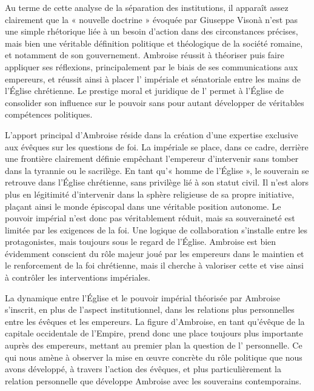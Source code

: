 Au terme de cette analyse de la séparation des institutions, il apparaît assez clairement que la « nouvelle doctrine » évoquée par Giuseppe Visonà n'est pas une simple rhétorique liée à un besoin d'action dans des circonstances précises, mais bien une véritable définition politique et théologique de la société romaine, et notamment de son gouvernement. Ambroise réussit à théoriser puis faire appliquer ses réflexions, principalement par le biais de ses communications aux empereurs, et réussit ainsi à placer l' impériale et sénatoriale entre les mains de l'Église chrétienne. Le prestige moral et juridique de l' permet à l'Église de consolider son influence sur le pouvoir sans pour autant développer de véritables compétences politiques.

\bigskip

L'apport principal d'Ambroise réside dans la création d'une expertise exclusive aux évêques sur les questions de foi. La  impériale se place, dans ce cadre, derrière une frontière clairement définie empêchant l'empereur d'intervenir sans tomber dans la tyrannie ou le sacrilège. En tant qu'« homme de l'Église », le souverain se retrouve dans l'Église chrétienne, sans privilège lié à son statut civil. Il n'est alors plus en légitimité d'intervenir dans la sphère religieuse de sa propre initiative, plaçant ainsi le monde épiscopal dans une véritable position autonome. Le pouvoir impérial n'est donc pas véritablement réduit, mais sa souveraineté est limitée par les exigences de la foi. Une logique de collaboration s'installe entre les protagonistes, mais toujours sous le regard de l'Église. Ambroise est bien évidemment conscient du rôle majeur joué par les empereurs dans le maintien et le renforcement de la foi chrétienne, mais il cherche à valoriser cette  et vise ainsi à contrôler les interventions impériales.

\bigskip

La dynamique entre l'Église et le pouvoir impérial théorisée par Ambroise s'inscrit, en plus de l'aspect institutionnel, dans les relations plus personnelles entre les évêques et les empereurs. La figure d'Ambroise, en tant qu'évêque de la capitale occidentale de l'Empire, prend donc une place toujours plus importante auprès des empereurs, mettant au premier plan la question de l' personnelle. Ce qui nous amène à observer la mise en œuvre concrète du rôle politique que nous avons développé, à travers l'action des évêques, et plus particulièrement la relation personnelle que développe Ambroise avec les souverains contemporains.

\bigskip
